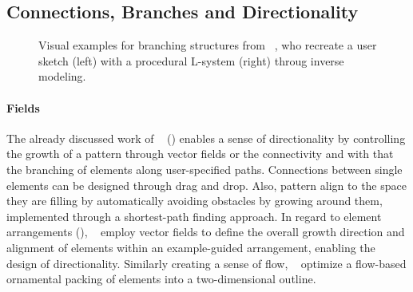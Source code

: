 \subsection{Connections, Branches and Directionality}
\label{subsec:analysis_connections_branches_and_directionality}

  

\begin{figure}[H]
    \centering
    \caption{\label{fig:guo_2020_ipm} Visual examples for branching structures from \citeauthor*{guo_2020_ipm}~\cite{guo_2020_ipm}, who recreate a user sketch (left) with a procedural L-system (right) throug inverse modeling.\color{orange}{ Status rights: ACM request updated.}}
\end{figure}

\paragraph*{Fields}
The already discussed work of \citeauthor*{gieseke_2017_ooo}~\cite{gieseke_2017_ooo} () enables a sense of directionality by controlling the growth of a pattern through vector fields or the connectivity and with that the branching of elements along user-specified paths. Connections between single elements can be designed through drag and drop. Also, pattern align to the space they are filling by automatically avoiding obstacles by growing around them, implemented through a shortest-path finding approach. In regard to element arrangements (), \citeauthor*{ijiri_2008_aeb}~\cite{ijiri_2008_aeb} employ vector fields to define the overall growth direction and alignment of elements within an example-guided arrangement, enabling the design of directionality. Similarly creating a sense of flow, \citeauthor*{saputra_2017_ffo}~\cite{saputra_2017_ffo} optimize a flow-based ornamental packing of elements into a two-dimensional outline. 

